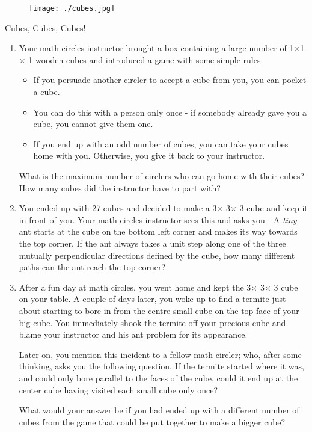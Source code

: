 \documentclass[12pt]{article}
\begin{document}
\begin{figure}[t!]
  \centering
  \texttt{[image: ./cubes.jpg]}
 \end{figure}
 \vspace{-40pt}
{\Large \centering \hspace{0.35\textwidth} Cubes, Cubes, Cubes!}
\date{\vspace{-10ex}}

\begin{enumerate}
\item Your math circles instructor brought a box containing a large number of 1$\times$1$\times$ 1 wooden cubes and introduced a game with some simple rules:
\begin{itemize}
\item If you persuade another circler to accept a cube from you, you can pocket a cube. 
\item You can do this with a person only once - if somebody already gave you a cube, you cannot give them one. 
\item If you end up with an odd number of cubes, you can take your cubes home with you. Otherwise, you give it back to your instructor.
\end{itemize}

What is the maximum number of circlers who can go home with their cubes? How many cubes did the instructor have to part with?

\item You ended up with 27 cubes and decided to make a 3$\times$ 3$ \times$ 3 cube and keep it in front of you. Your math circles instructor sees this and asks you - A \emph{tiny} ant starts at the cube on the bottom left corner and makes its way towards the top corner. If the ant always takes a unit step along one of the three mutually perpendicular directions defined by the cube, how many different paths can the ant reach the top corner?


\item After a fun day at math circles, you went home and kept the 3$\times$ 3$ \times$ 3 cube on your table. A couple of days later, you woke up to find a termite just about starting to bore in from the centre small cube on the top face of your big cube. You immediately shook the termite off your precious cube and blame your instructor and his ant problem for its appearance.

Later on, you mention this incident to a fellow math circler; who, after some thinking, asks you the following question. If the termite started where it was, and could only bore parallel to the faces of the cube, could it end up at the center cube having visited each small cube only once?

What would your answer be if you had ended up with a different number of cubes from the game that could be put together to make a bigger cube?
\end{enumerate}
\end{document}
